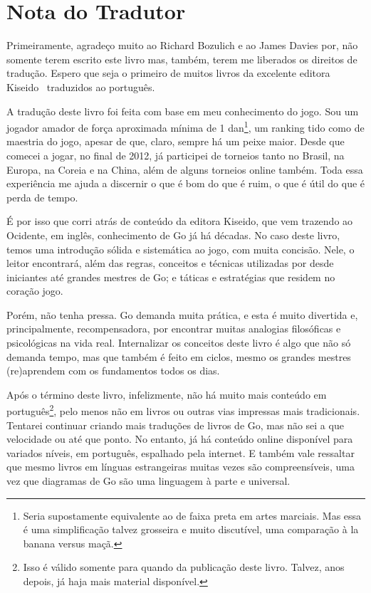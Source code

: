 \chapter{Nota do Tradutor}

Primeiramente, agradeço muito ao Richard Bozulich e ao James Davies por, não somente terem escrito este livro mas, também, terem me liberados os direitos de tradução. Espero que seja o primeiro de muitos livros da excelente editora Kiseido~\cite{kiseido} traduzidos ao português.

\bigskip

A tradução deste livro foi feita com base em meu conhecimento do jogo. Sou um jogador amador de força aproximada mínima de 1 dan\footnote{Seria supostamente equivalente ao de faixa preta em artes marciais. Mas essa é uma simplificação talvez grosseira e muito discutível, uma comparação à la banana versus maçã.}, um ranking tido como de maestria do jogo, apesar de que, claro, sempre há um peixe maior. Desde que comecei a jogar, no final de 2012, já participei de torneios tanto no Brasil, na Europa, na Coreia e na China, além de alguns torneios online também. Toda essa experiência me ajuda a discernir o que é bom do que é ruim, o que é útil do que é perda de tempo.

É por isso que corri atrás de conteúdo da editora Kiseido, que vem trazendo ao Ocidente, em inglês, conhecimento de Go já há décadas. No caso deste livro, temos uma introdução sólida e sistemática ao jogo, com muita concisão. Nele, o leitor encontrará, além das regras, conceitos e técnicas utilizadas por desde iniciantes até grandes mestres de Go; e táticas e estratégias que residem no coração jogo.

Porém, não tenha pressa. Go demanda muita prática, e esta é muito divertida e, principalmente, recompensadora, por encontrar muitas analogias filosóficas e psicológicas na vida real. Internalizar os conceitos deste livro é algo que não só demanda tempo, mas que também é feito em ciclos, mesmo os grandes mestres (re)aprendem com os fundamentos todos os dias.

\pagebreak

Após o término deste livro, infelizmente, não há muito mais conteúdo em português\footnote{Isso é válido somente para quando da publicação deste livro. Talvez, anos depois, já haja mais material disponível.}, pelo menos não em livros ou outras vias impressas mais tradicionais. Tentarei continuar criando mais traduções de livros de Go, mas não sei a que velocidade ou até que ponto. No entanto, já há conteúdo online disponível para variados níveis, em português, espalhado pela internet. E também vale ressaltar que mesmo livros em línguas estrangeiras muitas vezes são compreensíveis, uma vez que diagramas de Go são uma linguagem à parte e universal.

